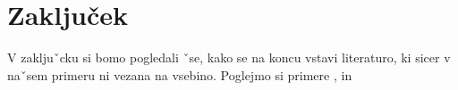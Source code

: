 \documentclass[12pt, a4paper]{article}
\begin{document}
\begin{center}
\end{center}

\section{Zaključek}

V zakljuˇcku si bomo pogledali ˇse, kako se na koncu vstavi literaturo, ki sicer v naˇsem primeru ni vezana na vsebino. Poglejmo si primere \cite{vidav}, \cite{article1} in \cite{article2}



\end{document}
